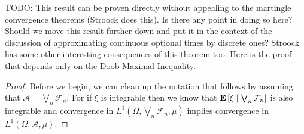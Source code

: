 TODO: This result can be proven directly without appealing to the martingle
convergence theorems (Stroock does this).  Is there any point in doing
so here?  Should we move this result further down and put it in the
context of the discussion of approximating continuous optional times
by discrete ones?  Stroock has some other interesting consequences of
this theorem too.
Here is the proof that depends only on the Doob Maximal Inequality.
\begin{proof}
Before we begin, we can clean up the notation that follows by assuming
that $\mathcal{A} = \bigvee_n \mathcal{F}_n$.  For if $\xi$ is
integrable then we know that
$\textbf{E}\left[ \xi \mid \bigvee_n \mathcal{F}_n \right]$ is also integrable
and convergence in $L^1(\Omega, \bigvee_n \mathcal{F}_n, \mu)$
implies convergence in $L^1(\Omega, \mathcal{A}, \mu)$.


\end{proof}
